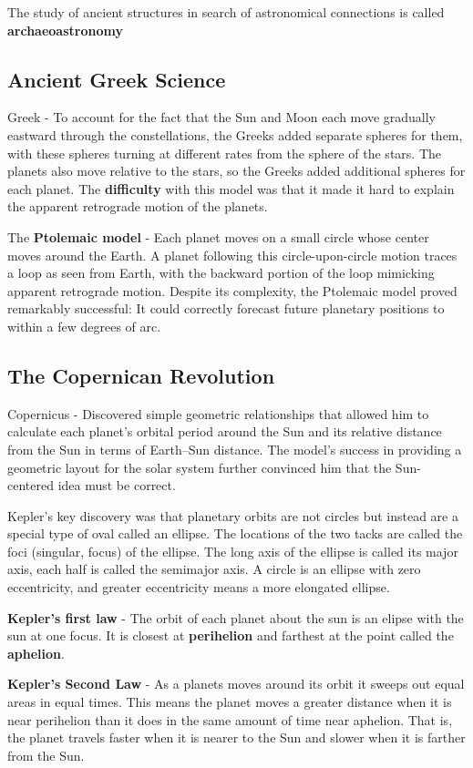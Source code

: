 \documentclass[12pt]{article}
\begin{document}
The study of ancient structures in search of astronomical connections is called {\bf archaeoastronomy}

\subsection{Ancient Greek Science}
Greek - To account for the fact that the Sun and Moon each move gradually eastward through the constellations, the Greeks added separate spheres for them, with these spheres turning at different rates from the sphere of the stars. The planets also move relative to the stars, so the Greeks added additional spheres for each planet. The {\bf difficulty} with this model was that it made it hard to explain the apparent retrograde motion of the planets.

The {\bf Ptolemaic model} - Each planet moves on a small circle whose center moves around the Earth. A planet following this circle-upon-circle motion traces a loop as seen from Earth, with the backward portion of the loop mimicking apparent retrograde motion. Despite its complexity, the Ptolemaic model proved remarkably successful: It could correctly forecast future planetary positions to within a few degrees of arc.

\subsection{The Copernican Revolution}
Copernicus - Discovered simple geometric relationships that allowed him to calculate each planet’s orbital period around the Sun and its relative distance from the Sun in terms of Earth–Sun distance. The model’s success in providing a geometric layout for the solar system further convinced him that the Sun-centered idea must be correct.

Kepler’s key discovery was that planetary orbits are not circles but instead are a special type of oval called an ellipse. The locations of the two tacks are called the foci (singular, focus) of the ellipse. The long axis of the ellipse is called its major axis, each half is called the semimajor axis. A circle is an ellipse with zero
eccentricity, and greater eccentricity means a more elongated ellipse.

{\bf Kepler's first law} - The orbit of each planet about the sun is an elipse with the sun at one focus. It is closest at {\bf perihelion} and farthest at the point called the {\bf aphelion}.

{\bf Kepler's Second Law} - As a planets moves around its orbit it sweeps out equal areas in equal times. This
means the planet moves a greater distance when it is near perihelion than it does in the same amount of time near aphelion. That is, the planet travels faster when it is nearer to the Sun and slower when it is farther from the Sun.
\end{document}

